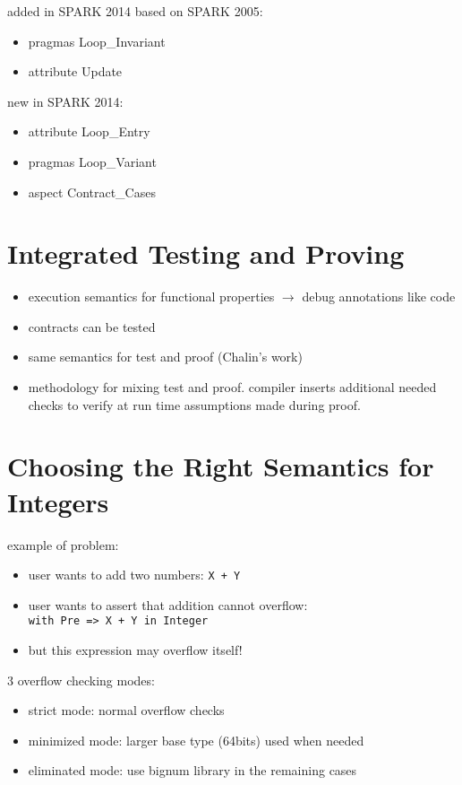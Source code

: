 \documentclass[sttt,draft]{svjour}
\begin{document}
\noindent
added in SPARK 2014 based on SPARK 2005:
\begin{itemize}
\item pragmas Loop\_Invariant
\item attribute Update
\end{itemize}

\noindent
new in SPARK 2014:
\begin{itemize}
\item attribute Loop\_Entry
\item pragmas Loop\_Variant
\item aspect Contract\_Cases
\end{itemize}

\section{Integrated Testing and Proving}

\begin{itemize}
\item execution semantics for functional properties $\rightarrow$ debug
  annotations like code
\item contracts can be tested
\item same semantics for test and proof (Chalin's work)
\item methodology for mixing test and proof. compiler inserts additional needed
  checks to verify at run time assumptions made during proof.
\end{itemize}

\section{Choosing the Right Semantics for Integers}

example of problem:
\begin{itemize}
\item user wants to add two numbers: \verb|X + Y|
\item user wants to assert that addition cannot overflow:\\
  \verb|with Pre => X + Y in Integer|
\item but this expression may overflow itself!
\end{itemize}

3 overflow checking modes:
\begin{itemize}
\item strict mode: normal overflow checks
\item minimized mode: larger base type (64bits) used when needed
\item eliminated mode: use bignum library in the remaining cases
\end{itemize}
\end{document}
